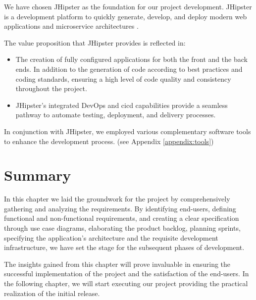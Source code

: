 We have chosen JHipster as the foundation for our project development. JHipster is a development
platform to quickly generate, develop, and deploy modern web applications and microservice
architectures \cite{jhipster}.

\noindent The value proposition that JHipster provides is reflected in:

\begin{itemize}
      \item The creation of fully configured applications for both the front and the back ends.
            In addition to the generation of code according to best practices and coding standards,
            ensuring a high level of code quality and consistency throughout the project.
      \item JHipster's integrated DevOps and \acrshort{cicd} capabilities provide a seamless pathway to automate
            testing, deployment, and delivery processes.
\end{itemize}

\noindent In conjunction with JHipster, we employed various complementary software tools to enhance
the development process. (see Appendix \ref{appendix:tools})

\section*{Summary}
In this chapter we laid the groundwork for the project by comprehensively gathering and analyzing
the requirements. By identifying end-users, defining functional and non-functional requirements,
and creating a clear specification through use case diagrams, elaborating the product backlog, planning
sprints, specifying the application's architecture and the requisite development infrastructure, we have
set the stage for the subsequent phases of development.

The insights gained from this chapter will prove invaluable in ensuring the successful implementation
of the project and the satisfaction of the end-users. In the following chapter, we will start executing
our project providing the practical realization of the initial release.
